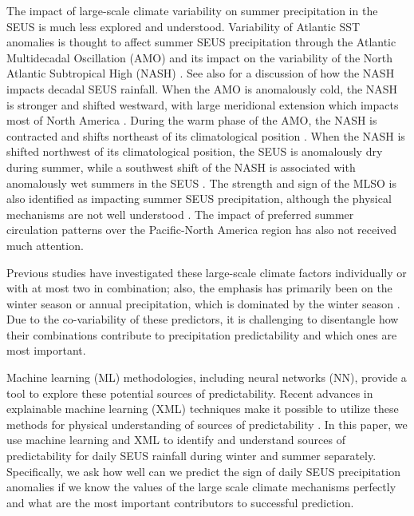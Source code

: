 \documentclass{ametsocV6.1}
\begin{document}
The impact of large-scale climate variability on summer precipitation in the SEUS is much less explored and understood.  Variability of Atlantic SST anomalies is thought to affect summer SEUS precipitation through the Atlantic Multidecadal Oscillation (AMO) and its impact on the variability of the North Atlantic Subtropical High (NASH) \citep{li_impacts_2019,li_variation_2012}. See also \cite{zhang_decadal_2022} for a discussion of how the NASH impacts decadal SEUS rainfall. When the AMO is anomalously cold, the NASH is stronger and shifted westward, with large meridional extension which impacts most of North America \citep{hu_variations_2011}.  During the warm phase of the AMO, the NASH is contracted and shifts northeast of its climatological position \citep{hu_variations_2011}.  When the NASH is shifted northwest of its climatological position, the SEUS is anomalously dry during summer, while a southwest shift of the NASH is associated with anomalously wet summers in the SEUS \citep{li_variation_2012}. The strength and sign of the MLSO is also identified as impacting summer SEUS precipitation, although the physical mechanisms are not well understood \citep{Manthos:2022}. The impact of preferred summer circulation patterns over the Pacific-North America region has also not received much attention.

Previous studies have investigated these large-scale climate factors individually or with at most two in combination; also, the emphasis has primarily been on the winter season or annual precipitation, which is dominated by the winter season \citep[e.g.,][]{arcodia_how_2020,Manthos:2022}. Due to the co-variability of these predictors, it is challenging to disentangle how their combinations contribute to precipitation predictability and which ones are most important. 

Machine learning (ML) methodologies, including neural networks (NN), provide a tool to explore these potential sources of predictability. Recent advances in explainable machine learning (XML) techniques make it possible to utilize these methods for physical understanding of sources of predictability \citep[e.g.,][]{toms_assessing_2021,toms_physically_2020,toms_testing_2021,barnes_indicator_2020,mcgovern_making_2019,mayer_subseasonal_2021}. In this paper, we use machine learning and XML to identify and understand sources of predictability for daily SEUS rainfall during winter and summer separately. Specifically, we ask how well can we predict the sign of daily SEUS precipitation anomalies if we know the values of the large scale climate mechanisms perfectly and what are the most important contributors to successful prediction.
  
\end{document}
